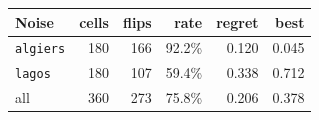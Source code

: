 \begin{tabular}{@{}lrrrrr@{}}
\toprule
Noise & cells & flips & rate & regret & best \\
\midrule
\texttt{algiers} & 180 & 166 & 92.2\% & 0.120 & 0.045 \\
\texttt{lagos} & 180 & 107 & 59.4\% & 0.338 & 0.712 \\
all & 360 & 273 & 75.8\% & 0.206 & 0.378 \\
\bottomrule
\end{tabular}
